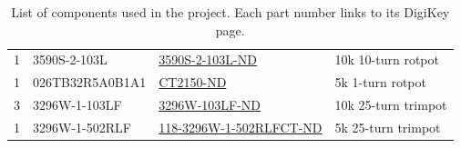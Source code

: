 \documentclass[11pt]{article}
\begin{document}
\begin{table}[H]
\begin{tabular}{|c|l|l|l|}
        1 & 3590S-2-103L & \href{https://www.digikey.com/en/products/detail/bourns-inc/3590S-2-103L/1088586}{3590S-2-103L-ND} & 10k 10-turn rotpot\\
        1 & 026TB32R5A0B1A1 & \href{https://www.digikey.com/en/products/detail/cts-electrocomponents/026TB32R5A0B1A1/203771}{CT2150-ND} & 5k 1-turn rotpot\\
        3 & 3296W-1-103LF & \href{https://www.digikey.com/en/products/detail/bourns-inc/3296W-1-103LF/1088045}{3296W-103LF-ND} & 10k 25-turn trimpot\\
        1 & 3296W-1-502RLF & \href{https://www.digikey.com/en/products/detail/bourns-inc/3296W-1-502RLF/2535942}{118-3296W-1-502RLFCT-ND} & 5k 25-turn trimpot\\
        \hline
    \end{tabular}
    \caption{List of components used in the project. Each part number links to its DigiKey page.}
    \label{tab:parts_list}
\end{table}
\end{document}
